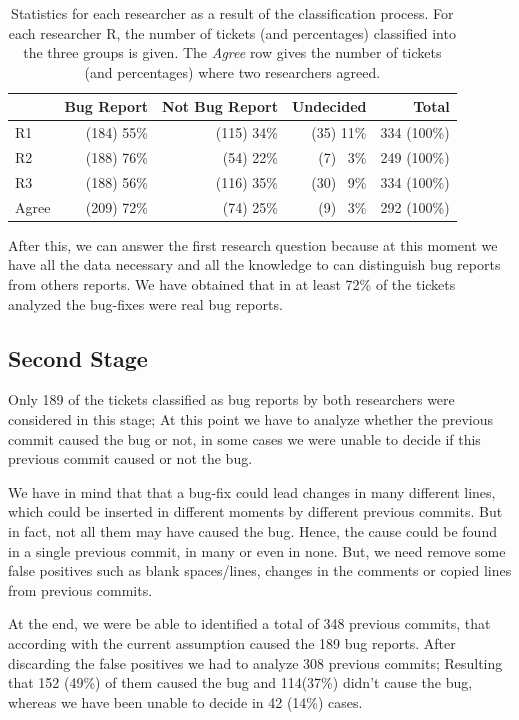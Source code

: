 \documentclass[ifip]{svmult}
\begin{document}
\begin{table}
\centering
\begin{tabular}{l|rrr|r}
\toprule[0.3mm]%
  & Bug Report & Not Bug Report & Undecided & Total \\\hline
R1  & (184) 55\% & (115) 34\% & (35) 11\% & 334 (100\%) \\
R2  & (188) 76\% & (54) 22\% & (7) ~3\% & 249 (100\%) \\
R3 & (188) 56\% & (116) 35\% & (30) ~9\% & 334 (100\%) \\ \hline
Agree & (209) 72\% & (74) 25\% & (9) ~3\% & 292 (100\%) \\
\bottomrule[0.3mm]
\end{tabular} %
\caption{Statistics for each researcher as a result of the classification process. For each researcher R, the number of tickets (and percentages) classified into the three groups is given. The \emph{Agree} row gives the number of tickets (and percentages) where two researchers agreed.}
\label{tab:2}
\end{table}


After this, we can answer the first research question because at this moment we have all the data necessary and all the knowledge to can distinguish bug reports from others reports. We have obtained that in at least 72\% of the tickets analyzed the bug-fixes were real bug reports.


\subsection{Second Stage}
\label{sec:resultsSS}

Only 189 of the tickets classified as bug reports by both researchers were considered in this stage; At this point we have to analyze whether the previous commit caused the bug or not, in some cases we were unable to decide if this previous commit caused or not the bug.

We have in mind that that a bug-fix could lead changes in many different lines, which could be inserted in different moments by different previous commits. But in fact, not all them may have caused the bug. Hence, the cause could be found in a single previous commit, in many or even in none. But, we need remove some false positives such as blank spaces/lines, changes in the comments or  copied lines from previous commits.  

At the end, we were be able to identified a total of 348 previous commits, that according with the current assumption caused the 189 bug reports. After discarding the false positives we had to analyze 308 previous commits; Resulting that 152 (49\%) of them caused the bug and 114(37\%) didn't cause the bug, whereas we have been unable to decide in 42 (14\%) cases.
\end{document}

